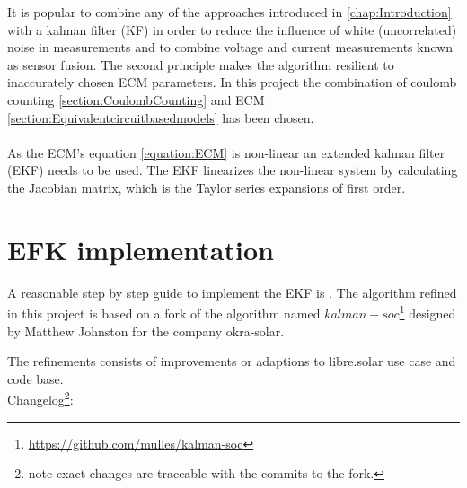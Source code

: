 It is popular to combine %
any of the approaches introduced in \ref{chap:Introduction} with a kalman filter (KF) in order to reduce the influence of white (uncorrelated) noise in measurements and to combine voltage and current measurements known as sensor fusion. The second principle makes the algorithm resilient to inaccurately chosen ECM parameters. In this project the combination of coulomb counting \ref{section:CoulombCounting} and ECM \ref{section:Equivalentcircuitbasedmodels} has been chosen. \\ %
\\
As the  ECM's equation \ref{equation:ECM}  is non-linear an extended kalman filter (EKF) needs to be used. The EKF linearizes the non-linear system by calculating the Jacobian matrix, which is the Taylor series expansions of first order.  %
\\

\section{EFK implementation}
\label{Fork}

A reasonable step by step guide to implement the EKF is \cite{rzepka2021implementing}. The algorithm refined in this project is based on a fork of the algorithm named $kalman-soc$\footnote{ \url{https://github.com/mulles/kalman-soc}} designed by Matthew Johnston for the company okra-solar. 

The refinements consists of improvements or adaptions to libre.solar use case and code base.
\\




Changelog\footnote{note exact changes are traceable with the commits to the fork. 
}: 

